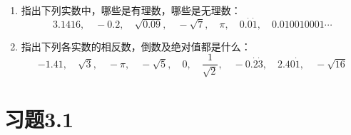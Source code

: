 \begin{ex}
\begin{enumerate}
    \item  指出下列实数中，哪些是有理数，哪些是无理数：
    \[3.1416,\quad -0.2,\quad \sqrt{0.09},\quad -\sqrt{7},\quad \pi,\quad 0.\dot{0}\dot{1},\quad 0.010010001\cdots\]
    \item 指出下列各实数的相反数，倒数及绝对值都是什么：
    \[-1.41,\quad \sqrt{3},\quad -\pi,\quad -\sqrt{5},\quad 0,\quad \frac{1}{\sqrt{2}},\quad -0.\dot{2}\dot{3},\quad 2.40\dot{1},\quad -\sqrt{16}\]
\end{enumerate}   
\end{ex}

\section*{习题3.1}
